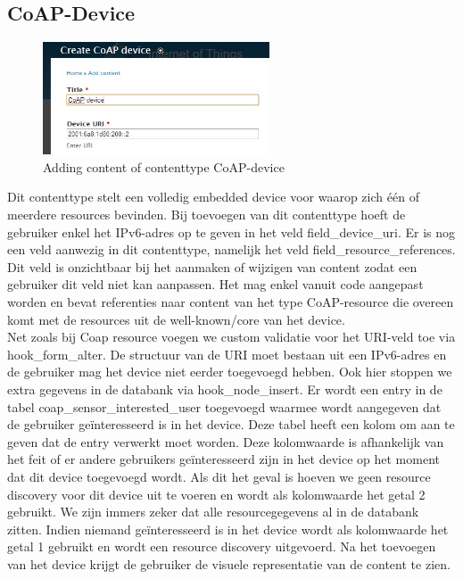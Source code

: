 \subsection{CoAP-Device}
\begin{figure}
\vspace{-10pt}
\centering
\label{fig:addCoapDevice}
\includegraphics[width=0.6\textwidth]{fig/add_coap_device}
\vspace{-20pt}
\centering
\caption{Adding content of contenttype CoAP-device}
\centering
\vspace{-20pt}
\end{figure}
Dit contenttype stelt een volledig embedded device voor waarop zich \'{e}\'{e}n of meerdere resources bevinden. Bij toevoegen van dit contenttype hoeft de gebruiker enkel het IPv6-adres op te geven in het veld field\_device\_uri. Er is nog een veld aanwezig in dit contenttype, namelijk het veld field\_resource\_references. Dit veld is onzichtbaar bij het aanmaken of wijzigen van content zodat een gebruiker dit veld niet kan aanpassen. Het mag enkel vanuit code aangepast worden en bevat referenties naar content van het type CoAP-resource die overeen komt met de resources uit de well-known/core van het device.\\

Net zoals bij Coap resource voegen we custom validatie voor het URI-veld toe via hook\_form\_alter. De structuur van de URI moet bestaan uit een IPv6-adres en de gebruiker mag het device niet eerder toegevoegd hebben. Ook hier stoppen we extra gegevens in de databank via hook\_node\_insert. Er wordt een entry in de tabel coap\_sensor\_interested\_user toegevoegd waarmee wordt aangegeven dat de gebruiker ge\"{i}nteresseerd is in het device. Deze tabel heeft een kolom om aan te geven dat de entry verwerkt moet worden. Deze kolomwaarde is afhankelijk van het feit of er andere gebruikers ge\"{i}nteresseerd zijn in het device op het moment dat dit device toegevoegd wordt. Als dit het geval is hoeven we geen resource discovery voor dit device uit te voeren en wordt als kolomwaarde het getal 2 gebruikt. We zijn immers zeker dat alle resourcegegevens al in de databank zitten. Indien niemand ge\"{i}nteresseerd is in het device wordt als kolomwaarde het getal 1 gebruikt en wordt een resource discovery uitgevoerd. Na het toevoegen van het device krijgt de gebruiker de visuele representatie van de content te zien.\\

